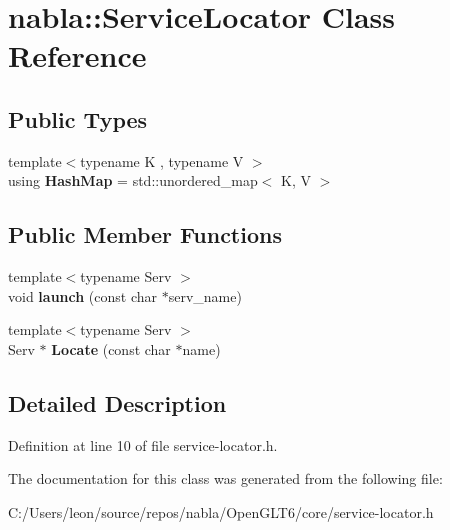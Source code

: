 \hypertarget{classnabla_1_1_service_locator}{}\section{nabla\+::Service\+Locator Class Reference}
\label{classnabla_1_1_service_locator}
\subsection*{Public Types}
\begin{DoxyCompactItemize}
\item 
\mbox{\label{classnabla_1_1_service_locator_a42756b69c11c011fe507276d9a506d1b}} 
{\footnotesize template$<$typename K , typename V $>$ }\\using {\bfseries Hash\+Map} = std\+::unordered\+\_\+map$<$ K, V $>$
\end{DoxyCompactItemize}
\subsection*{Public Member Functions}
\begin{DoxyCompactItemize}
\item 
\mbox{\label{classnabla_1_1_service_locator_afe958b541a63a56d7d32e563332b31bb}} 
{\footnotesize template$<$typename Serv $>$ }\\void {\bfseries launch} (const char $\ast$serv\+\_\+name)
\item 
\mbox{\label{classnabla_1_1_service_locator_ad9d11cf92529d1f28388b20cc820e92c}} 
{\footnotesize template$<$typename Serv $>$ }\\Serv $\ast$ {\bfseries Locate} (const char $\ast$name)
\end{DoxyCompactItemize}


\subsection{Detailed Description}


Definition at line 10 of file service-\/locator.\+h.



The documentation for this class was generated from the following file\+:\begin{DoxyCompactItemize}
\item 
C\+:/\+Users/leon/source/repos/nabla/\+Open\+G\+L\+T6/core/service-\/locator.\+h\end{DoxyCompactItemize}
